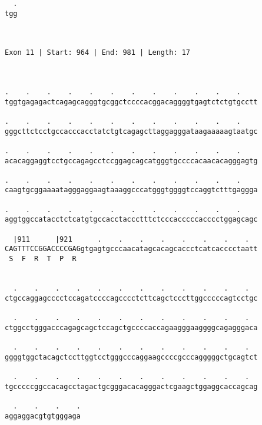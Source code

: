 \documentclass{article}
\begin{document}
\begin{Verbatim}
  .
tgg
   
   
 
Exon 11 | Start: 964 | End: 981 | Length: 17



.    .    .    .    .    .    .    .    .    .    .    .    
tggtgagagactcagagcagggtgcggctccccacggacaggggtgagtctctgtgcctt
                                                            
.    .    .    .    .    .    .    .    .    .    .    .    
gggcttctcctgccacccacctatctgtcagagcttaggagggataagaaaaagtaatgc
                                                            
.    .    .    .    .    .    .    .    .    .    .    .    
acacaggaggtcctgccagagcctccggagcagcatgggtgccccacaacacagggagtg
                                                            
.    .    .    .    .    .    .    .    .    .    .    .    
caagtgcggaaaatagggaggaagtaaaggcccatgggtggggtccaggtctttgaggga
                                                            
.    .    .    .    .    .    .    .    .    .    .    .    
aggtggccatacctctcatgtgccacctaccctttctcccacccccacccctggagcagc
                                                            
  |911      |921      .    .    .    .    .    .    .    .  
CAGTTTCCGGACCCCGAGgtgagtgcccaacatagcacagcaccctcatcacccctaatt
 S  F  R  T  P  R                                           
                                                            
  
  .    .    .    .    .    .    .    .    .    .    .    .  
ctgccaggagcccctccagatccccagcccctcttcagctcccttggcccccagtcctgc
                                                            
  .    .    .    .    .    .    .    .    .    .    .    .  
ctggcctgggacccagagcagctccagctgccccaccagaagggaaggggcagagggaca
                                                            
  .    .    .    .    .    .    .    .    .    .    .    .  
ggggtggctacagctccttggtcctgggcccaggaagccccgcccagggggctgcagtct
                                                            
  .    .    .    .    .    .    .    .    .    .    .    .  
tgcccccggccacagcctagactgcgggacacagggactcgaagctggaggcaccagcag
                                                            
  .    .    .    .
aggaggacgtgtgggaga
                  

\end{Verbatim}
\end{document}
